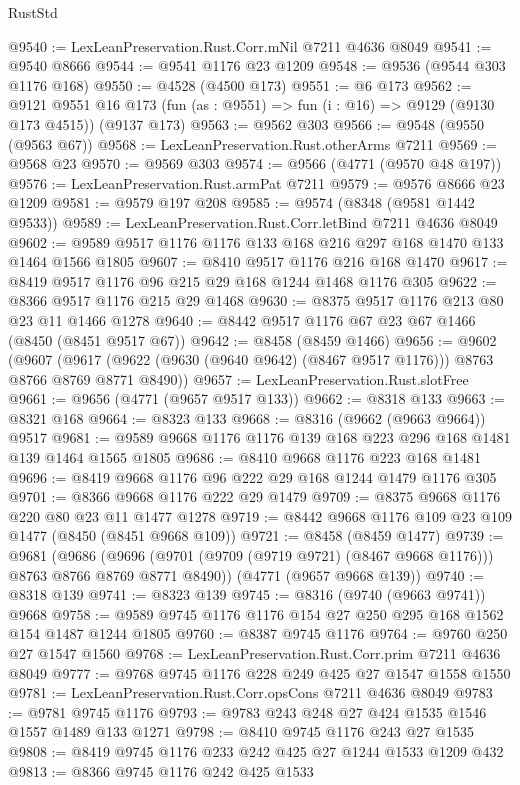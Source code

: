 \begin{lexlean}{RustStd}
\begin{coremodule}
@9540 := LexLeanPreservation.Rust.Corr.mNil @7211 @4636 @8049
@9541 := @9540 @8666
@9544 := @9541 @1176 @23 @1209
@9548 := @9536 (@9544 @303 @1176 @168)
@9550 := @4528 (@4500 @173)
@9551 := @6 @173
@9562 := @9121
    @9551
    @16
    @173
    (fun (as : @9551) => fun (i : @16) => @9129 (@9130 @173 @4515))
    (@9137 @173)
@9563 := @9562 @303
@9566 := @9548 (@9550 (@9563 @67))
@9568 := LexLeanPreservation.Rust.otherArms @7211
@9569 := @9568 @23
@9570 := @9569 @303
@9574 := @9566 (@4771 (@9570 @48 @197))
@9576 := LexLeanPreservation.Rust.armPat @7211
@9579 := @9576 @8666 @23 @1209
@9581 := @9579 @197 @208
@9585 := @9574 (@8348 (@9581 @1442 @9533))
@9589 := LexLeanPreservation.Rust.Corr.letBind @7211 @4636 @8049
@9602 := @9589 @9517 @1176 @1176 @133 @168 @216 @297 @168 @1470 @133 @1464 @1566 @1805
@9607 := @8410 @9517 @1176 @216 @168 @1470
@9617 := @8419 @9517 @1176 @96 @215 @29 @168 @1244 @1468 @1176 @305
@9622 := @8366 @9517 @1176 @215 @29 @1468
@9630 := @8375 @9517 @1176 @213 @80 @23 @11 @1466 @1278
@9640 := @8442 @9517 @1176 @67 @23 @67 @1466 (@8450 (@8451 @9517 @67))
@9642 := @8458 (@8459 @1466)
@9656 := @9602
    (@9607 (@9617 (@9622 (@9630 (@9640 @9642) (@8467 @9517 @1176))) @8763 @8766 @8769 @8771 @8490))
@9657 := LexLeanPreservation.Rust.slotFree
@9661 := @9656 (@4771 (@9657 @9517 @133))
@9662 := @8318 @133
@9663 := @8321 @168
@9664 := @8323 @133
@9668 := @8316 (@9662 (@9663 @9664)) @9517
@9681 := @9589 @9668 @1176 @1176 @139 @168 @223 @296 @168 @1481 @139 @1464 @1565 @1805
@9686 := @8410 @9668 @1176 @223 @168 @1481
@9696 := @8419 @9668 @1176 @96 @222 @29 @168 @1244 @1479 @1176 @305
@9701 := @8366 @9668 @1176 @222 @29 @1479
@9709 := @8375 @9668 @1176 @220 @80 @23 @11 @1477 @1278
@9719 := @8442 @9668 @1176 @109 @23 @109 @1477 (@8450 (@8451 @9668 @109))
@9721 := @8458 (@8459 @1477)
@9739 := @9681
    (@9686 (@9696 (@9701 (@9709 (@9719 @9721) (@8467 @9668 @1176))) @8763 @8766 @8769 @8771 @8490))
    (@4771 (@9657 @9668 @139))
@9740 := @8318 @139
@9741 := @8323 @139
@9745 := @8316 (@9740 (@9663 @9741)) @9668
@9758 := @9589 @9745 @1176 @1176 @154 @27 @250 @295 @168 @1562 @154 @1487 @1244 @1805
@9760 := @8387 @9745 @1176
@9764 := @9760 @250 @27 @1547 @1560
@9768 := LexLeanPreservation.Rust.Corr.prim @7211 @4636 @8049
@9777 := @9768 @9745 @1176 @228 @249 @425 @27 @1547 @1558 @1550
@9781 := LexLeanPreservation.Rust.Corr.opsCons @7211 @4636 @8049
@9783 := @9781 @9745 @1176
@9793 := @9783 @243 @248 @27 @424 @1535 @1546 @1557 @1489 @133 @1271
@9798 := @8410 @9745 @1176 @243 @27 @1535
@9808 := @8419 @9745 @1176 @233 @242 @425 @27 @1244 @1533 @1209 @432
@9813 := @8366 @9745 @1176 @242 @425 @1533

\end{coremodule}
\end{lexlean}
